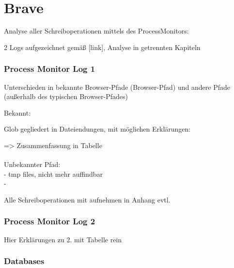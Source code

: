 \section{Brave}

Analyse aller Schreiboperationen mittels des ProcessMonitors:

2 Logs aufgezeichnet gemäß [link], Analyse in getrennten Kapiteln

\subsubsection*{Process Monitor Log 1}

Unterschieden in bekannte Browser-Pfade (Browser-Pfad) und andere Pfade (außerhalb des typischen Browser-Pfades)

Bekannt:

Glob gegliedert in Dateiendungen, mit möglichen Erklärungen: \\

=> Zusammenfassung in Tabelle \\\\

Unbekannter Pfad:\\
- tmp files, nicht mehr auffindbar\\
- 


Alle Schreiboperationen mit aufnehmen in Anhang evtl.

\subsubsection*{Process Monitor Log 2}

Hier Erklärungen zu 2. mit Tabelle rein

\subsubsection*{Databases}

